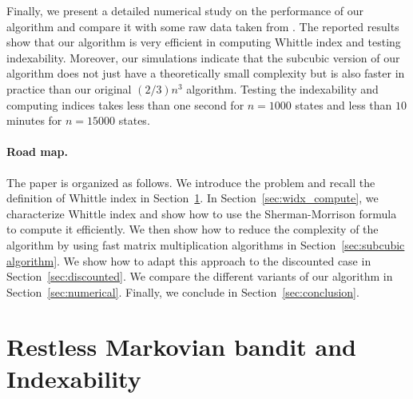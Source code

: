 \documentclass[acmsmall,screen,anonymous]{acmart}
\begin{document}
Finally, we present a detailed numerical study on the performance of our algorithm and compare it with some raw data taken from \cite{nino2020fast}. The reported results show that our algorithm is very efficient in computing Whittle index and testing indexability. Moreover, our simulations indicate that the subcubic version of our algorithm does not just have a theoretically small complexity but is also faster in practice than our original $(2/3)n^3$ algorithm. Testing the indexability and computing indices takes less than one second for $n=1000$ states and less than $10$ minutes for $n=15000$ states.

\paragraph*{Road map.}
The paper is organized as follows. We introduce the problem and recall the definition of Whittle index in Section~\ref{sec:bandits}. In Section~\ref{sec:widx_compute}, we characterize Whittle index and show how to use the Sherman-Morrison formula to compute it efficiently. We then show how to reduce the complexity of the algorithm by using fast matrix multiplication algorithms in Section~\ref{sec:subcubic algorithm}. We show how to adapt this approach to the discounted case in Section~\ref{sec:discounted}. We compare the different variants of our algorithm in Section~\ref{sec:numerical}. Finally, we conclude in Section~\ref{sec:conclusion}.




\section{Restless Markovian bandit and Indexability}
\label{sec:bandits}

\end{document}
